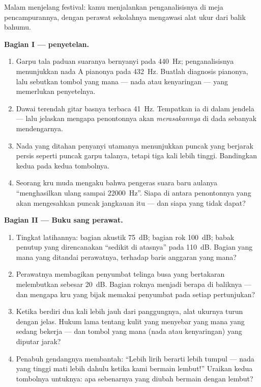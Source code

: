 \begin{problem}\label{pb:g8:sound-pitch-loudness:1}
Malam menjelang festival: kamu menjalankan penganalisisnya di meja
pencampurannya, dengan perawat sekolahnya mengawasi alat ukur
 dari balik bahumu.

\medskip\noindent\textbf{Bagian I ---  penyetelan.}
\begin{enumerate}
  \item Garpu tala paduan suaranya bernyanyi pada \qty{440}{Hz};
        penganalisisnya menunjukkan nada A pianonya pada
        \qty{432}{Hz}. Buatlah diagnosis pianonya, lalu sebutkan
        tombol yang mana --- nada atau kenyaringan --- yang memerlukan
        penyetelnya.
  \item Dawai terendah gitar basnya terbaca \qty{41}{Hz}. Tempatkan
        ia di dalam jendela  --- lalu jelaskan mengapa
        penontonnya akan \emph{merasakannya} di dada sebanyak
        mendengarnya.
  \item Nada yang ditahan penyanyi utamanya menunjukkan puncak yang
        berjarak persis seperti puncak garpu talanya, tetapi tiga kali
        lebih tinggi. Bandingkan kedua  pada kedua tombolnya.
  \item Seorang kru muda mengaku bahwa pengeras suara baru aulanya
        ``menghasilkan ulang sampai \qty{22000}{Hz}''. Siapa di antara
        penontonnya yang akan mengesahkan puncak jangkauan itu ---
        dan siapa yang tidak dapat?
\end{enumerate}

\medskip\noindent\textbf{Bagian II --- Buku sang perawat.}
\begin{enumerate}[resume]
  \item Tingkat latihannya: bagian akustik \qty{75}{dB}; bagian rok
        \qty{100}{dB}; babak penutup yang direncanakan ``sedikit di
        atasnya'' pada \qty{110}{dB}. Bagian yang mana yang ditandai
        perawatnya, terhadap baris anggaran yang mana?
  \item Perawatnya membagikan penyumbat telinga busa yang bertakaran
        melembutkan  sebesar \qty{20}{dB}. Bagian roknya menjadi
        berapa di baliknya --- dan mengapa kru yang bijak memakai
        penyumbat pada setiap pertunjukan?
  \item Ketika berdiri dua kali lebih jauh dari panggungnya, alat
        ukurnya turun dengan jelas. Hukum lama tentang kulit yang
        menyebar yang mana yang sedang bekerja --- dan tombol yang mana
        (nada atau kenyaringan) yang diputar jarak?
  \item Penabuh gendangnya membantah: ``Lebih lirih berarti lebih
        tumpul --- nada yang tinggi mati lebih dahulu ketika kami
        bermain lembut!'' Uraikan kedua tombolnya untuknya: apa
        sebenarnya yang diubah bermain dengan lembut?
\end{enumerate}


\end{problem}
